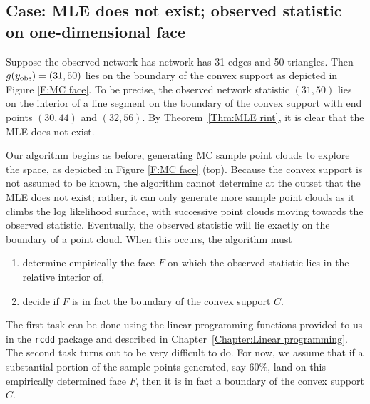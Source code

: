 \subsection{Case: MLE does not exist; observed statistic on one-dimensional face}
Suppose the observed network has network has 31 edges and 50 triangles.  Then 
$g(y_{\textrm{obs}}) = (31,50)$ lies on the boundary of the convex support as depicted in 
Figure \ref{F:MC face}.  To be precise, the observed network statistic $(31,50)$ lies 
on the interior of a line segment on the boundary of the convex support with 
end points $(30,44)$ and $(32,56)$. 
By Theorem~\ref{Thm:MLE rint}, it is clear that the MLE does not exist.

Our algorithm begins as before, generating MC sample point clouds to explore the 
space, as depicted in Figure \ref{F:MC face} (top).  Because the convex 
support is not assumed to be known, 
the algorithm cannot determine at the outset that the MLE does 
not exist; rather, it can only generate more sample point clouds as it climbs the log 
likelihood surface, with successive point clouds moving towards the observed statistic.
Eventually, the observed statistic will lie exactly on the boundary of a point cloud.
When this occurs, the algorithm must 
\begin{enumerate}
\item determine empirically the face $F$ on which the observed statistic lies in the 
relative interior of,
\item decide if $F$ is in fact the boundary of the convex support $C$.
\end{enumerate}  

The first task can be done using the linear programming functions provided to us in 
the \texttt{rcdd} package and described in Chapter~\ref{Chapter:Linear programming}.  The second task turns out to be very difficult to do.  
For now, we assume that if a substantial portion of the sample points generated, say 
60\%, land on this empirically determined face $F$, then it is in fact a boundary of 
the convex support $C$.  


